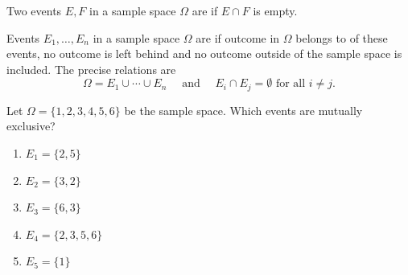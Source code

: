 \documentclass[../main.tex]{subfiles}
\begin{document}
\begin{definition} \label{def:mutually-exclusive}
  Two events \(E, F\) in a sample space \(\Omega\) are  if \(E \cap F\) is empty. 

  Events \(E_{1}, \ldots, E_{n}\) in a sample space \(\Omega\) are  if  outcome in \(\Omega\) belongs to  of these events, no outcome is left behind and no outcome outside of the sample space is included. The precise relations are
  \[
    \Omega = E_{1} \cup \cdots \cup E_{n} \quad\text{ and }\quad E_{i} \cap E_{j} = \emptyset \text{ for all } i \ne j. 
  \]
\end{definition}



%

\begin{example} \label{ex:mutually-exclusive-identify}
  Let \(\Omega = \{1,2,3,4,5,6\}\) be the sample space. Which events are mutually exclusive?

  \begin{enumerate}[label=(\alph*)]
    \item \(E_{1} = \{2,5\}\)
    \item \(E_{2} = \{3,2\}\)
    \item \(E_{3} = \{6,3\}\)
    \item \(E_{4} = \{2,3,5,6\}\)
    \item \(E_{5} = \{1\}\)
  \end{enumerate}
\end{example}
\vfill{}
\end{document}
